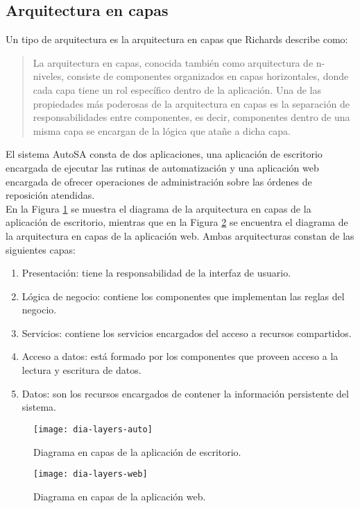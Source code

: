 \subsection{Arquitectura en capas}
Un tipo de arquitectura es la arquitectura en capas que Richards\cite{SoftwareArchitecturePatterns} describe como:
\begin{quote}
La arquitectura en capas, conocida también como arquitectura de n-niveles, consiste de componentes organizados en capas horizontales, donde cada capa tiene un rol específico dentro de la aplicación. Una de las propiedades más poderosas de la arquitectura en capas es la separación de responsabilidades entre componentes, es decir, componentes dentro de una misma capa se encargan de la lógica que atañe a dicha capa.
\end{quote}
El sistema AutoSA consta de dos aplicaciones, una aplicación de escritorio encargada de ejecutar las rutinas de automatización y una aplicación web encargada de ofrecer operaciones de administración sobre las órdenes de reposición atendidas.\\
En la Figura \ref{fig:dia-layers-auto} se muestra el diagrama de la arquitectura en capas de la aplicación de escritorio, mientras que en la Figura \ref{fig:dia-layers-web} se encuentra el diagrama de la arquitectura en capas de la aplicación web. Ambas arquitecturas constan de las siguientes capas:
\begin{enumerate}
	\item Presentación: tiene la responsabilidad de la interfaz de usuario.
	\item Lógica de negocio: contiene los componentes que implementan las reglas del negocio.
	\item Servicios: contiene los servicios encargados del acceso a recursos compartidos.
	\item Acceso a datos: está formado por los componentes que proveen acceso a la lectura y escritura de datos.
	\item Datos: son los recursos encargados de contener la información persistente del sistema.
\end{enumerate}
\begin{figure}[h]
\centering
\texttt{[image: dia-layers-auto]}
\caption{Diagrama en capas de la aplicación de escritorio.}
\label{fig:dia-layers-auto}
\end{figure}
\begin{figure}[h]
\centering
\texttt{[image: dia-layers-web]}
\caption{Diagrama en capas de la aplicación web.}
\label{fig:dia-layers-web}
\end{figure}
